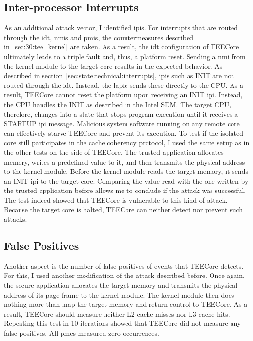 \subsection{Inter-processor Interrupts}
\label{sec:evaluation:ipi}
As an additional attack vector, I identified \glspl{ipi}. For interrupts that
are routed through the \gls{idt}, \glspl{nmi} and \glspl{pmi}, the
countermeasures described in~\ref{sec:30:tee_kernel} are taken. As a result, the
\gls{idt} configuration of TEECore ultimately leads to a triple fault and, thus,
a platform reset. Sending a \gls{nmi} from the kernel module to the target core
results in the expected behavior. As described in
section~\ref{sec:state:technical:interrupts}, \glspl{ipi} such as INIT are not
routed through the \gls{idt}. Instead, the \gls{lapic} sends these directly to
the CPU. As a result, TEECore cannot reset the platform upon receiving an INIT
\gls{ipi}. Instead, the CPU handles the INIT as described in the Intel SDM. The
target CPU, therefore, changes into a state that stops program execution until
it receives a STARTUP \gls{ipi} message. Malicious system software running on
any remote core can effectively starve TEECore and prevent its execution. To
test if the isolated core still participates in the cache coherency protocol, I
used the same setup as in the other tests on the side of TEECore. The trusted
application allocates memory, writes a predefined value to it, and then
transmits the physical address to the kernel module. Before the kernel module
reads the target memory, it sends an INIT \gls{ipi} to the target core.
Comparing the value read with the one written by the trusted application before
allows me to conclude if the attack was successful. The test indeed showed that
TEECore is vulnerable to this kind of attack. Because the target core is halted,
TEECore can neither detect nor prevent such attacks.

\subsection{False Positives}
\label{sec:evaluation:fp}
Another aspect is the number of false positives of events that TEECore detects.
For this, I used another modification of the attack described before. Once
again, the secure application allocates the target memory and transmits the
physical address of its page frame to the kernel module. The kernel module then
does nothing more than map the target memory and return control to TEECore. As a
result, TEECore should measure neither L2 cache misses nor L3 cache hits.
Repeating this test in 10 iterations showed that TEECore did not measure any
false positives. All \glspl{pmc} measured zero occurrences.\\

